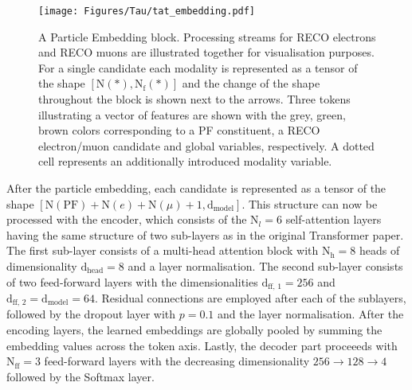 \begin{figure}[t!]
    \centering
    \texttt{[image: Figures/Tau/tat\_embedding.pdf]}
    \caption{A Particle Embedding block. Processing streams for RECO electrons and RECO muons are illustrated together for visualisation purposes. For a single \tauh candidate each modality is represented as a tensor of the shape $[\text{N}(*), \text{N}_\text{f}(*)]$ and the change of the shape throughout the block is shown next to the arrows. Three tokens illustrating a vector of features are shown with the grey, green, brown colors corresponding to a PF constituent, a RECO electron/muon candidate and global variables, respectively. A dotted cell represents an additionally introduced modality variable.}
    \label{fig:tat_embedding}
\end{figure}

After the particle embedding, each \tauh candidate is represented as a tensor of the shape $[\text{N}(\text{PF})+\text{N}(e)+\text{N}(\mu)+1, \text{d}_\text{model}]$. This structure can now be processed with the encoder, which consists of the $\text{N}_l=6$ self-attention layers having the same structure of two sub-layers as in the original Transformer paper. The first sub-layer consists of a multi-head attention block with $\text{N}_\text{h}=8$ heads of dimensionality $\text{d}_\text{head}=8$ and a layer normalisation. The second sub-layer consists of two feed-forward layers with the dimensionalities $\text{d}_\text{ff, 1}=256$ and $\text{d}_\text{ff, 2}=\text{d}_\text{model}=64$. Residual connections are employed after each of the sublayers, followed by the dropout layer with $p=0.1$ and the layer normalisation. After the encoding layers, the learned embeddings are globally pooled by summing the embedding values across the token axis. Lastly, the decoder part proceeeds with $\text{N}_\text{ff}=3$ feed-forward layers with the decreasing dimensionality $256 \to 128 \to 4$ followed by the Softmax layer.   

